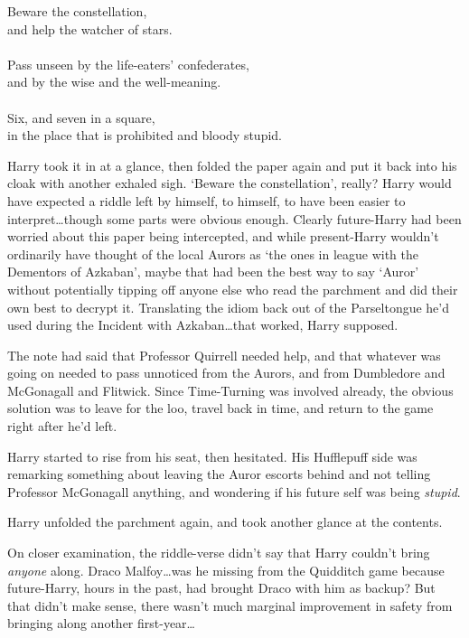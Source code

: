 \begin{writtenNote}
Beware the constellation,\\
and help the watcher of stars.\\
\\
Pass unseen by the life-eaters’ confederates,\\
and by the wise and the well-meaning.\\
\\
Six, and seven in a square,\\
in the place that is prohibited and bloody stupid.
\end{writtenNote}

Harry took it in at a glance, then folded the paper again and put it back into his cloak with another exhaled sigh. ‘Beware the constellation’, really? Harry would have expected a riddle left by himself, to himself, to have been easier to interpret…though some parts were obvious enough. Clearly future-Harry had been worried about this paper being intercepted, and while present-Harry wouldn’t ordinarily have thought of the local Aurors as ‘the ones in league with the Dementors of Azkaban’, maybe that had been the best way to say ‘Auror’ without potentially tipping off anyone else who read the parchment and did their own best to decrypt it. Translating the idiom back out of the Parseltongue he’d used during the Incident with Azkaban…that worked, Harry supposed.

The note had said that Professor Quirrell needed help, and that whatever was going on needed to pass unnoticed from the Aurors, and from Dumbledore and McGonagall and Flitwick. Since Time-Turning was involved already, the obvious solution was to leave for the loo, travel back in time, and return to the game right after he’d left.

Harry started to rise from his seat, then hesitated. His Hufflepuff side was remarking something about leaving the Auror escorts behind and not telling Professor McGonagall anything, and wondering if his future self was being \emph{stupid}.

Harry unfolded the parchment again, and took another glance at the contents.

On closer examination, the riddle-verse didn’t say that Harry couldn’t bring \emph{anyone} along. Draco Malfoy…was he missing from the Quidditch game because future-Harry, hours in the past, had brought Draco with him as backup? But that didn’t make sense, there wasn’t much marginal improvement in safety from bringing along another first-year…

